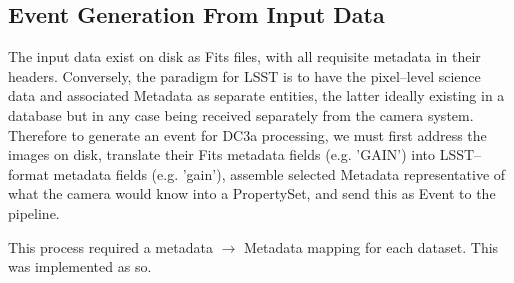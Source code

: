 \subsection{Event Generation From Input Data}

The input data exist on disk as Fits files, with all requisite
metadata in their headers.  Conversely, the paradigm for LSST is to
have the pixel--level science data and associated Metadata as separate
entities, the latter ideally existing in a database but in any case
being received separately from the camera system.  Therefore to
generate an event for DC3a processing, we must first address the
images on disk, translate their Fits metadata fields (e.g. 'GAIN')
into LSST--format metadata fields (e.g. 'gain'), assemble selected Metadata
representative of what the camera would know into a PropertySet, and
send this as Event to the pipeline.

This process required a metadata $\rightarrow$ Metadata mapping for
each dataset.  This was implemented as so.
